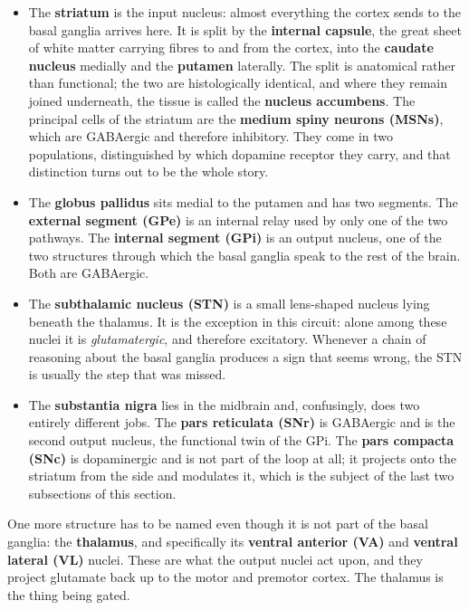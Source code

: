 \documentclass[11pt]{article}
\begin{document}
\begin{itemize}
    \item The \textbf{striatum} is the input nucleus: almost everything the cortex sends to the basal ganglia arrives here. It is split by the \textbf{internal capsule}, the great sheet of white matter carrying fibres to and from the cortex, into the \textbf{caudate nucleus} medially and the \textbf{putamen} laterally. The split is anatomical rather than functional; the two are histologically identical, and where they remain joined underneath, the tissue is called the \textbf{nucleus accumbens}. The principal cells of the striatum are the \textbf{medium spiny neurons (MSNs)}, which are GABAergic and therefore inhibitory. They come in two populations, distinguished by which dopamine receptor they carry, and that distinction turns out to be the whole story.
    \item The \textbf{globus pallidus} sits medial to the putamen and has two segments. The \textbf{external segment (GPe)} is an internal relay used by only one of the two pathways. The \textbf{internal segment (GPi)} is an output nucleus, one of the two structures through which the basal ganglia speak to the rest of the brain. Both are GABAergic.
    \item The \textbf{subthalamic nucleus (STN)} is a small lens-shaped nucleus lying beneath the thalamus. It is the exception in this circuit: alone among these nuclei it is \textit{glutamatergic}, and therefore excitatory. Whenever a chain of reasoning about the basal ganglia produces a sign that seems wrong, the STN is usually the step that was missed.
    \item The \textbf{substantia nigra} lies in the midbrain and, confusingly, does two entirely different jobs. The \textbf{pars reticulata (SNr)} is GABAergic and is the second output nucleus, the functional twin of the GPi. The \textbf{pars compacta (SNc)} is dopaminergic and is not part of the loop at all; it projects onto the striatum from the side and modulates it, which is the subject of the last two subsections of this section.
\end{itemize}

One more structure has to be named even though it is not part of the basal ganglia: the \textbf{thalamus}, and specifically its \textbf{ventral anterior (VA)} and \textbf{ventral lateral (VL)} nuclei. These are what the output nuclei act upon, and they project glutamate back up to the motor and premotor cortex. The thalamus is the thing being gated.
\end{document}
